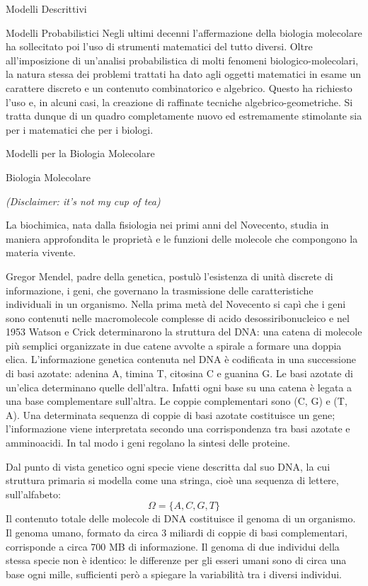 \documentclass{article}
\begin{document}
\begin{section}{Modelli Descrittivi}
\begin{subsection}{Modelli Probabilistici}
			Negli ultimi decenni l’affermazione della biologia molecolare ha sollecitato poi l’uso di strumenti matematici del tutto diversi. Oltre all’imposizione di un’analisi probabilistica di molti fenomeni biologico-molecolari, la natura stessa dei problemi trattati ha dato agli oggetti matematici in esame un carattere discreto e un contenuto combinatorico e algebrico. 
			Questo ha richiesto l’uso e, in alcuni casi, la creazione di raffinate tecniche algebrico-geometriche. Si tratta dunque di un quadro completamente nuovo ed estremamente stimolante sia per i matematici che per i biologi.
		\end{subsection}
	\end{section}
	\newpage
	
	\begin{section}{Modelli per la Biologia Molecolare}

		\begin{subsection}{Biologia Molecolare}
			
			\begin{center} \emph{(Disclaimer: it's not my cup of tea)} \end{center}
			La biochimica, nata dalla fisiologia nei primi anni del Novecento, studia in maniera approfondita le proprietà e le funzioni delle molecole che compongono la materia vivente.
		
			Gregor Mendel, padre della genetica, postulò l’esistenza di unità discrete di informazione, i geni, che governano la trasmissione delle caratteristiche individuali in un organismo. 
			Nella prima metà del Novecento si capì che i geni sono contenuti nelle macromolecole complesse di acido desossiribonucleico e nel 1953 Watson e Crick determinarono la struttura del DNA: una catena di molecole più semplici organizzate in due catene avvolte a spirale a formare una doppia elica. 
			L’informazione genetica contenuta nel DNA è codificata in una successione di basi azotate: adenina A, timina T, citosina C e guanina G. 
			Le basi azotate di un’elica determinano quelle dell’altra. Infatti ogni base su una catena è legata a una base complementare sull’altra. Le coppie complementari sono (C, G) e (T, A). Una determinata sequenza di coppie di basi azotate costituisce un gene; l'informazione viene interpretata secondo una corrispondenza tra basi azotate e amminoacidi. In tal modo i geni regolano la sintesi delle proteine. 
			
			Dal punto di vista genetico ogni specie viene descritta dal suo DNA, la cui struttura primaria si modella come una stringa, cioè una sequenza di lettere, sull’alfabeto: $$ \Omega = \{ A, C, G, T \}$$
			Il contenuto totale delle molecole di DNA costituisce il genoma di un organismo. Il genoma umano, formato da circa 3 miliardi di coppie di basi complementari, corrisponde a circa 700 MB di informazione. 
			Il genoma di due individui della stessa specie non è identico: le differenze per gli esseri umani sono di circa una base ogni mille, sufficienti però a spiegare la variabilità tra i diversi individui. 
			

\end{subsection}
\end{section}
\end{document}
